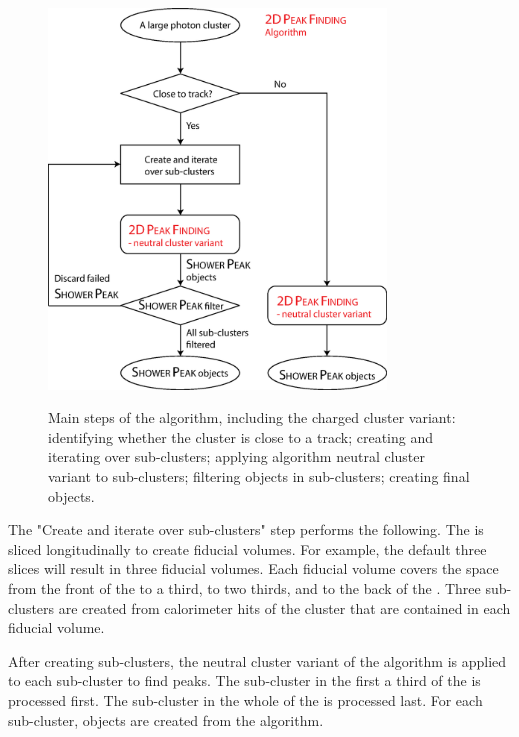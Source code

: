 \begin{figure}[tbph]
\centering
{\includegraphics[width=0.8\textwidth]{photon/2DpeakFindingTrack}}
\caption[Flow chart for \peakFinding algorithm.]
{Main steps of the  \peakFinding algorithm, including the charged cluster variant: identifying whether the cluster is close to a track; creating and iterating over sub-clusters; applying \peakFinding algorithm neutral cluster variant to sub-clusters; filtering \ShowerPeak objects in sub-clusters; creating final \ShowerPeak objects.}
\label{fig:photonPeakFindingFlow}
\end{figure}


The "Create and iterate over sub-clusters" step performs the following. The \ECAL is sliced longitudinally to create fiducial volumes. For example, the default three slices will result in three \ECAL fiducial volumes. Each fiducial volume covers the  space from the front of the \ECAL to a third, to two thirds, and to the back of the \ECAL. Three sub-clusters are created from calorimeter hits of the cluster that are contained in each fiducial volume.

After creating sub-clusters, the neutral cluster variant of the  \peakFinding algorithm is applied to each sub-cluster to find peaks.  The sub-cluster in the first a third of the \ECAL is processed first. The sub-cluster in the whole of the \ECAL is processed last. For each sub-cluster,  \ShowerPeak objects are created from the  \peakFinding algorithm.

